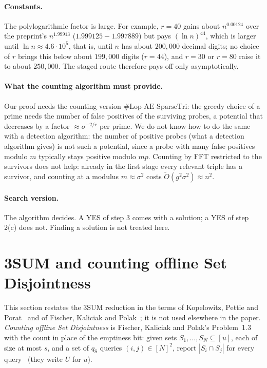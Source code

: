\documentclass[11pt]{article}
\theoremstyle{definition}
\theoremstyle{remark}
\newcommand{\Lop}{\mathrm{Lop}\text{-}\allowbreak\mathrm{AE}\text{-}\allowbreak\mathrm{SparseTri}}
\begin{document}
\paragraph{Constants.} The polylogarithmic factor is large. For example, $r=40$ gains about $n^{0.00124}$ over the preprint's $n^{1.99913}$ ($1.999125-1.997889$) but pays $(\ln n)^{44}$, which is larger until $\ln n\approx4.6\cdot10^5$, that is, until $n$ has about $200{,}000$ decimal digits; no choice of $r$ brings this below about $199{,}000$ digits ($r=44$), and $r=30$ or $r=80$ raise it to about $250{,}000$. The staged route therefore pays off only asymptotically.

\paragraph{What the counting algorithm must provide.} Our proof needs the counting version $\#\Lop$: the greedy choice of a prime needs the number of false positives of the surviving probes, a potential that decreases by a factor $\approx\sigma^{-2/r}$ per prime. We do not know how to do the same with a detection algorithm: the number of positive probes (what a detection algorithm gives) is not such a potential, since a probe with many false positives modulo $m$ typically stays positive modulo $mp$. Counting by FFT restricted to the survivors does not help: already in the first stage every relevant triple has a survivor, and counting at a modulus $m\approx\sigma^2$ costs $\tilde O(g^2\sigma^2)\approx n^2$.

\paragraph{Search version.} The algorithm decides. A YES of step 3 comes with a solution; a YES of step 2(c) does not. Finding a solution is not treated here.

\section{3SUM and counting offline Set Disjointness}\label{s:sec:kpp}

This section restates the 3SUM reduction in the terms of Kopelowitz, Pettie and Porat~\cite{KPP16} and of Fischer, Kaliciak and Polak~\cite{FKP24}; it is not used elsewhere in the paper. \emph{Counting offline Set Disjointness} is Fischer, Kaliciak and Polak's Problem~1.3 with the count in place of the emptiness bit: given sets $S_1,\dots,S_N\subseteq[u]$, each of size at most $s$, and a set of $q_{\mathrm S}$ queries $(i,j)\in[N]^2$, report $|S_i\cap S_j|$ for every query~\cite[p.~3]{FKP24} (they write $U$ for $u$).
\end{document}
